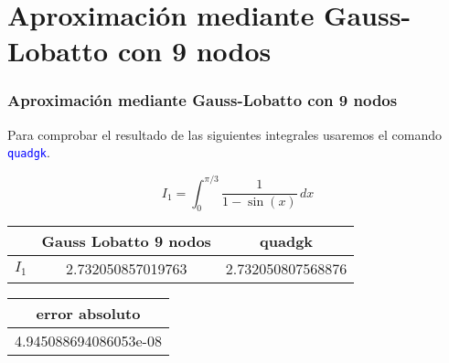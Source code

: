 \documentclass{beamer}
\begin{document}
\section{Aproximación mediante Gauss-Lobatto con 9 nodos}
\begin{frame}
\frametitle{Aproximación mediante Gauss-Lobatto con 9 nodos}

Para comprobar el resultado de las siguientes integrales usaremos el comando \textcolor{blue}{\texttt{quadgk}}.

\[
\displaystyle I_1 = \int_{0}^{\pi/3} \! \frac{1}{1 - \sin(x)} \, dx
\]

\begin{table}[h]
    \centering
    \begin{tabular}{|c|c|c|}
        \hline
        \rowcolor{gray!30}
         & Gauss Lobatto 9 nodos & quadgk \\
        \hline
         $I_1$ & 2.732050857019763 & 2.732050807568876 \\
        \hline
    \end{tabular}
\end{table}

\vspace{0.5em}

\begin{table}[h]
    \centering
    \begin{tabular}{|c|}
        \hline
        \rowcolor{gray!30}
         error absoluto \\
        \hline
         4.945088694086053e-08 \\
        \hline
    \end{tabular}
\end{table}
\end{frame}

\end{document}
